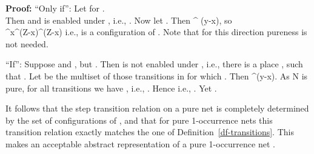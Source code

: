 \documentclass[twocolumn]{article}
\newcommand{\out}[1]{}        \newcommand{\ams}[1]{#1}      \usepackage[preserveurlmacro]{breakurl}
\newenvironment{proof}{\begin{trivlist} \item[\hspace{\labelsep}\bf
Proof:]}{\hfill \end{trivlist}}
\newcommand{\df}[1]{Definition~\ref{df-#1}}
\newcommand{\pr}[1]{Proposition~\ref{pr-#1}}
\begin{document}
\begin{proof}``Only if'': Let  for .\\ Then  and  is
enabled under , i.e., . Now let
. Then ^\bullet
(y-x), so\\ ^\bullet\!x^\bullet (Z\!-\!x)^\bullet (Z\!-\!x) i.e.,  is a
configuration of . Note that for this direction pureness is not needed.

``If'': 
Suppose  and , but .
Then \mbox{} is not enabled under , i.e., there is a place
, such that . Let  be the multiset of
those transitions  in  for which . Then ^\bullet (y-x). As N is pure, for all
transitions  we have , i.e., .
Hence  i.e., . Yet .
\end{proof}
It follows that the step transition relation on a pure net  is
\pagebreak[2]
completely determined by the set of configurations of , and that
for pure 1-occurrence nets this transition relation exactly matches
the one of \df{transitions}.  This makes  an acceptable
abstract representation of a pure 1-occurrence net .

\out{ Moreover, the transition relation of \df{transitions}
 generalises verbatim to multiset systems (reading  for
  and  for ), and by \pr{transitions-PN} this
 generalised transition relation exactly matches the one on pure Petri nets.
}
\end{document}

